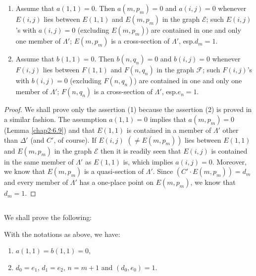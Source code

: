 \subsection{}\label{chap2:6.12}
\begin{lemma*}
  \begin{enumerate}
    \renewcommand{\labelenumi}{\rm(\theenumi)}
  \item Assume that $a(1,1)=0$. Then $a(m,p_{m})=0$ and $a(i,j)=0$
    whenever $E(i,j)$ lies between $E(1,1)$ and $E(m,p_{m})$ in the
    graph $\mathscr{E}$; such $E(i,j)$'s with $a(i,j)=0$ (excluding
    $E(m,p_{m})$) are contained in one and only one member of
    $\Lambda'$; $E(m,p_{m})$ is a cross-section of $\Lambda'$, esp.\@ $d_{m}=1$.
    
  \item Assume that $b(1,1)=0$. Then $b(n,q_{n})=0$ and $b(i,j)=0$
    whenever $F(i,j)$ lies between $F(1,1)$ and $F(n,q_{n})$ in the
    graph $\mathscr{F}$; such $F(i,j)$'s with $b(i,j)=0$ (excluding
    $F(n,q_{n})$) are contained in one and only one member of
    $\Lambda'$; $F(n,q_{n})$ is a cross-section of $\Lambda'$, esp.\@ $e_{n}=1$.
  \end{enumerate}
\end{lemma*}

\begin{proof}
We shall prove only the assertion (1) because the assertion (2) is
proved in a similar fashion. The assumption $a(1,1)=0$ implies that
$a(m,p_{m})=0$ (\cf Lemma \ref{chap2:6.9}) and that $E(1,1)$ is contained
in a member of $\Lambda'$ other than $\Delta'$ (and $C'$, of
course). If $E(i,j)$ $(\neq E(m,p_{m}))$ lies between $E(1,1)$ and
$E(m,p_{m})$ in the graph $\mathscr{E}$ then it is readily seen that
$E(i,j)$ is contained in the same member of $\Lambda'$ as $E(1,1)$ is,
which implies $a(i,j)=0$. Moreover, we know that $E(m,p_{m})$ is a
quasi-section of $\Lambda'$. Since $(C'\cdot E(m,p_{m}))=d_{m}$ and
every member of $\Lambda'$ has a one-place point on $E(m,p_{m})$, we
know that $d_{m}=1$.
\end{proof}

\subsection{}\label{chap2:6.13}
We shall prove the following:

\begin{lemma*}
With the notations as above, we have:
\begin{enumerate}
\renewcommand{\labelenumi}{\rm(\theenumi)}
\item $a(1,1)=b(1,1)=0$,\pageoriginale\

\item $d_{0}=e_{1}$, $d_{1}=e_{2}$, $n=m+1$ and $(d_{0},e_{0})=1$.
\end{enumerate}
\end{lemma*}

